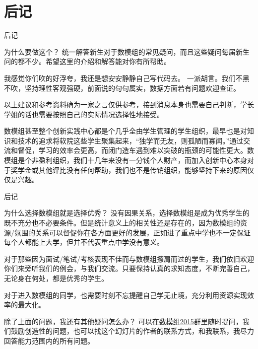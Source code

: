 \documentclass{beamer}
\begin{document}
\section{后记}
\begin{frame}{后记}
	\begin{alertblock}{为什么要做这个？}
		统一解答新生对于数模组的常见疑问，而且这些疑问每届新生问的都不少。希望这里的介绍和解答能对你有所帮助。
	\end{alertblock}
	\begin{block}{我感觉你们吹的好浮夸，我还是想安安静静自己写代码去。}
		一派胡言。我们不黑不吹，坚持理性客观强硬，前面说的句句属实，数据方面若有问题欢迎查证。
		
		以上建议和参考资料确为一家之言仅供参考，接到消息本身也需要自己判断，学长学姐的话也需要按照自己的实际情况选择性地接受。
		
		数模组甚至整个创新实践中心都是个几乎全由学生管理的学生组织，最早也是对知识和技术的追求将软院这些学生聚集起来，“独学而无友，则孤陋而寡闻。”通过交流和督促，学习的效率会更高，而闭门造车遇到难以突破的瓶颈的可能性更大。数模组是个非盈利组织，我们十几年来没有一分钱个人财产，而加入创新中心本身对于奖学金或其他评比没有任何帮助，我们也不是传销组织，能够坚持下来的原因仅仅是兴趣。
	\end{block}
\end{frame}

\begin{frame}{后记}
\begin{alertblock}{为什么选择数模组就是选择优秀？}
	没有因果关系，选择数模组是成为优秀学生的既不充分也不必要条件。但是统计意义上的相关性还是存在的，因为数模组的资源/氛围的关系可以督促你在各方面更好的发展，正如进了重点中学也不一定保证每个人都能上大学，但并不代表重点中学没有意义。
	
	对于那些因为面试/笔试/考核表现不佳而与数模组擦肩而过的学生，我们依旧欢迎你们来旁听我们的例会，与我们交流。只要保持认真的求知态度，不断完善自己，无论身在何处，都是优秀的学生。
	
	对于进入数模组的同学，也需要时刻不忘提醒自己学无止境，充分利用资源实现效率的最大化。
\end{alertblock}

\begin{block}{除了上面的问题，我还有其他疑问怎么办？}
	可以在\hyperlink{qun}{数模组2015}群里随时提问，我们鼓励创造性的问题，也可以找这个幻灯片的作者的联系方式，和我联系，我尽力回答能力范围内的所有问题。
\end{block}
\end{frame}
\end{document}
